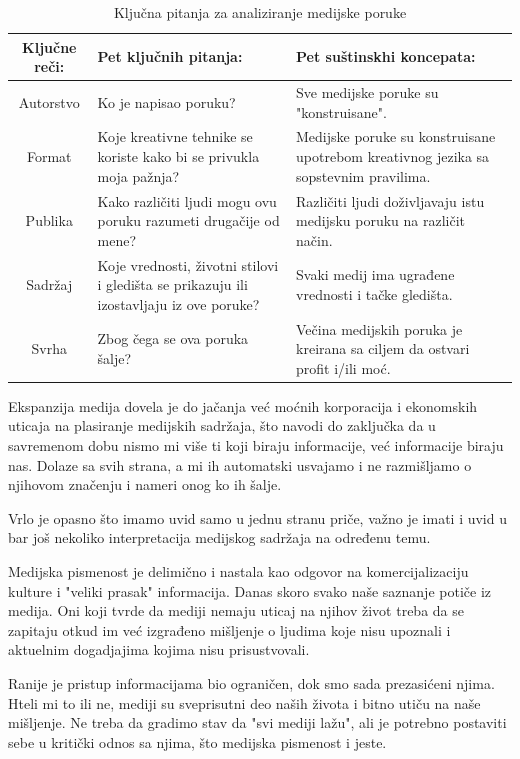 \documentclass[a4paper]{article}
\begin{document}
\begin{table}[h!]
\begin{center}
\begin{tabular}{|c|p{7cm}|p{5cm} |} \hline
Ključne reči:& Pet ključnih pitanja:& Pet suštinskhi koncepata:\\ \hline
Autorstvo&Ko je napisao poruku?&Sve medijske poruke su "konstruisane".\\ \hline
Format &Koje kreativne tehnike se koriste kako bi se privukla moja pažnja?&Medijske poruke su konstruisane upotrebom kreativnog jezika sa sopstevnim pravilima.\\ \hline
Publika &Kako različiti ljudi mogu ovu poruku razumeti drugačije od mene?&Različiti ljudi doživljavaju istu medijsku poruku na različit način.\\ \hline
Sadržaj &Koje vrednosti, životni stilovi i gledišta se prikazuju ili izostavljaju iz ove poruke?&Svaki medij ima ugrađene vrednosti i tačke gledišta.\\ \hline
Svrha &Zbog čega se ova poruka šalje?&Večina medijskih poruka je kreirana sa ciljem da ostvari profit i/ili moć.\\ \hline
\end{tabular}
\caption{ Ključna pitanja za analiziranje medijske poruke}
\label{tab:tabela2}
\end{center}
\end{table}

Ekspanzija medija dovela je do jačanja već moćnih korporacija i ekonomskih uticaja na plasiranje medijskih sadržaja, što navodi do zaključka da u savremenom dobu nismo mi više ti koji biraju informacije, već informacije biraju nas. Dolaze sa svih strana, a mi ih automatski usvajamo i ne razmišljamo o njihovom značenju i nameri onog ko ih šalje.

Vrlo je opasno što imamo uvid samo u jednu stranu priče, važno je imati i uvid u bar još nekoliko interpretacija medijskog sadržaja na određenu temu.

Medijska pismenost je delimično i nastala kao odgovor na komercijalizaciju kulture i "veliki prasak" informacija. Danas skoro svako naše saznanje potiče iz medija. Oni koji tvrde da mediji nemaju uticaj na njihov život treba da se zapitaju otkud im već izgrađeno mišljenje o ljudima koje nisu upoznali i aktuelnim dogadjajima kojima nisu prisustvovali.

Ranije je pristup informacijama bio ograničen, dok smo sada prezasićeni njima. Hteli mi to ili ne, mediji su sveprisutni deo naših života i bitno utiču na naše mišljenje. Ne treba da gradimo stav da "svi mediji lažu", ali je potrebno postaviti sebe u kritički odnos sa njima, što medijska pismenost i jeste.
\end{document}

